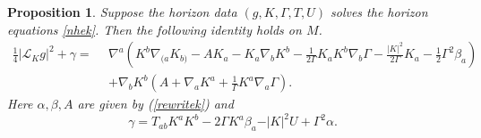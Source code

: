 \documentclass[11pt, reqno]{amsart}
\theoremstyle{plain}
\newtheorem{prop}[theorem]{Proposition}
\theoremstyle{definition}
\numberwithin{equation}{section}
\begin{document}
\begin{prop} \label{prop1}
    Suppose the horizon data $(g,K,\Gamma,T,U)$ solves the horizon equations \eqref{nhek}. Then the following identity holds on $M$.
    \begin{align}  \label{magid}
        \frac 14\vert \mathcal{L}_K g \vert^2 + \gamma = \:\:&\nabla^a\left(K^b\nabla_{(a}K_{b)} - AK_a -  K_a\nabla_b K^b -\frac{1}{2\Gamma}K_aK^b\nabla_b\Gamma - \frac{\vert K \vert^2}{2\Gamma}K_a - \frac 12\Gamma^2 \beta_a\right) \nonumber \\
        &+ \nabla_bK^b\left(A + \nabla_a K^a + \frac{1}{\Gamma}K^a\nabla_a\Gamma\right).
    \end{align}
    Here $\alpha,\beta,A$ are given by (\ref{rewritek}) and 
    \begin{equation} \label{Ldef}
        \gamma = T_{ab}K^aK^b - 2\Gamma K^a\beta_a - \vert K \vert^2 U + \Gamma^2 \alpha.
    \end{equation}
\end{prop}
\end{document}
